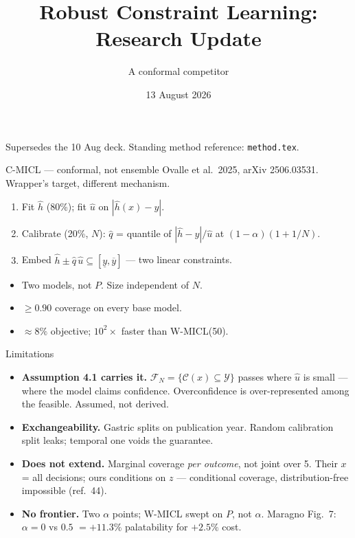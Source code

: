 \documentclass{beamer}
\title{Robust Constraint Learning: Research Update}
\subtitle{A conformal competitor}
\date{13 August 2026}
\begin{document}
\begin{frame}
  \titlepage
  \begin{center}\footnotesize
  Supersedes the 10 Aug deck. Standing method reference: \texttt{method.tex}.
  \end{center}
\end{frame}

\begin{frame}{C-MICL --- conformal, not ensemble}
  Ovalle et al.\ 2025, arXiv 2506.03531. Wrapper's target, different mechanism.
  \begin{enumerate}
    \item Fit $\hat h$ (80\%); fit $\hat u$ on $|\hat h(x)-y|$.
    \item Calibrate (20\%, $N$): $\hat q$ = quantile of $|\hat h-y|/\hat u$ at
      $(1-\alpha)(1+1/N)$.
    \item Embed $\hat h\pm\hat q\,\hat u\subseteq[\underline y,\overline y]$ ---
      two linear constraints.
  \end{enumerate}
  \medskip
  \begin{itemize}
    \item Two models, not $P$. Size independent of $N$.
    \item $\ge0.90$ coverage on every base model.
    \item ${\approx}8\%$ objective; $10^2\times$ faster than W-MICL(50).
  \end{itemize}
\end{frame}

\begin{frame}{Limitations}
  \small
  \begin{itemize}
    \item \textbf{Assumption 4.1 carries it.}
      $\mathcal F_N=\{\mathcal C(x)\subseteq\mathcal Y\}$ passes where $\hat u$ is
      small --- where the model claims confidence. Overconfidence is
      over-represented among the feasible. Assumed, not derived.
    \item \textbf{Exchangeability.} Gastric splits on publication year. Random
      calibration split leaks; temporal one voids the guarantee.
    \item \textbf{Does not extend.} Marginal coverage \emph{per outcome}, not
      joint over 5. Their $x$ = all decisions; ours conditions on $z$ ---
      conditional coverage, distribution-free impossible (ref.\ 44).
    \item \textbf{No frontier.} Two $\alpha$ points; W-MICL swept on $P$, not
      $\alpha$. Maragno Fig.\ 7: $\alpha{=}0$ vs $0.5$ $=+11.3\%$ palatability
      for $+2.5\%$ cost.
  \end{itemize}
\end{frame}
\end{document}

